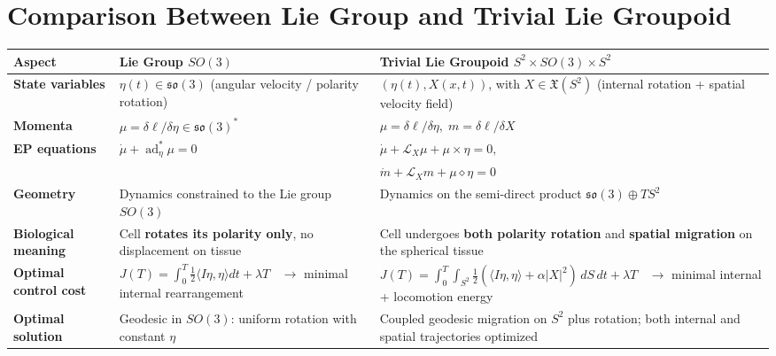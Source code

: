 \documentclass{article}
\begin{document}
\section*{Comparison Between Lie Group and Trivial Lie Groupoid}

\renewcommand{\arraystretch}{1.4}
\setlength{\tabcolsep}{8pt}
\begin{tabular}{|p{3cm}|p{5cm}|p{7cm}|}
\hline
\textbf{Aspect} & \textbf{Lie Group $SO(3)$} & \textbf{Trivial Lie Groupoid $S^2 \times SO(3) \times S^2$} \\
\hline
\textbf{State variables} & 
$\eta(t)\in \mathfrak{so}(3)$ (angular velocity / polarity rotation) &
$(\eta(t), X(x,t))$, with $X\in \mathfrak{X}(S^2)$ (internal rotation + spatial velocity field) \\
\hline
\textbf{Momenta} &
$\mu = \delta \ell/\delta \eta \in \mathfrak{so}(3)^*$ &
$\mu = \delta \ell/\delta \eta,\; m = \delta \ell/\delta X$ \\
\hline
\textbf{EP equations} &
$\dot\mu + \operatorname{ad}^*_\eta \mu = 0$ &
$\dot\mu + \mathcal L_X\mu + \mu\times\eta=0,$ \\
& &
$\dot m + \mathcal L_X m + \mu\diamond\eta=0$ \\
\hline
\textbf{Geometry} &
Dynamics constrained to the Lie group $SO(3)$ &
Dynamics on the semi-direct product $\mathfrak{so}(3)\oplus TS^2$ \\
\hline
\textbf{Biological meaning} &
Cell \textbf{rotates its polarity only}, no displacement on tissue &
Cell undergoes \textbf{both polarity rotation} and \textbf{spatial migration} on the spherical tissue \\
\hline
\textbf{Optimal control cost} &
$J(T)=\int_0^T \tfrac12\langle I\eta,\eta\rangle dt + \lambda T$ 
$\;\;\rightarrow$ minimal internal rearrangement &
$J(T)=\int_0^T\int_{S^2} \tfrac12(\langle I\eta,\eta\rangle+\alpha |X|^2)\,dS\,dt+\lambda T$ 
$\;\;\rightarrow$ minimal internal + locomotion energy \\
\hline
\textbf{Optimal solution} &
Geodesic in $SO(3)$: uniform rotation with constant $\eta$ &
Coupled geodesic migration on $S^2$ plus rotation; both internal and spatial trajectories optimized \\
\hline
\end{tabular}
\end{document}
